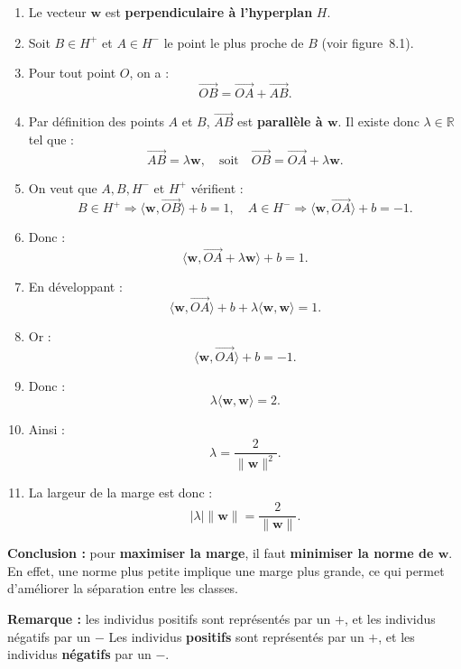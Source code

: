 \begin{enumerate}
    \item Le vecteur \(\mathbf{w}\) est \textbf{perpendiculaire à l’hyperplan} \(H\).
    \item Soit \(B \in H^+\) et \(A \in H^-\) le point le plus proche de \(B\)
    (voir figure~8.1).
    \item Pour tout point \(O\), on a :
    \[
    \overrightarrow{OB} = \overrightarrow{OA} + \overrightarrow{AB}.
    \]
    \item Par définition des points \(A\) et \(B\), \(\overrightarrow{AB}\) est
    \textbf{parallèle à \(\mathbf{w}\)}. Il existe donc \(\lambda \in \mathbb{R}\)
    tel que :
    \[
    \overrightarrow{AB} = \lambda \mathbf{w}, \quad \text{soit} \quad
    \overrightarrow{OB} = \overrightarrow{OA} + \lambda \mathbf{w}.
    \]
    \item On veut que \(A, B, H^-\) et \(H^+\) vérifient :
    \[
    B \in H^+ \Rightarrow \langle \mathbf{w}, \overrightarrow{OB} \rangle + b = 1,
    \quad
    A \in H^- \Rightarrow \langle \mathbf{w}, \overrightarrow{OA} \rangle + b = -1.
    \]
    \item Donc :
    \[
    \langle \mathbf{w}, \overrightarrow{OA} + \lambda \mathbf{w} \rangle + b = 1.
    \]
    \item En développant :
    \[
    \langle \mathbf{w}, \overrightarrow{OA} \rangle + b + \lambda \langle \mathbf{w}, \mathbf{w} \rangle = 1.
    \]
    \item Or :
    \[
    \langle \mathbf{w}, \overrightarrow{OA} \rangle + b = -1.
    \]
    \item Donc :
    \[
    \lambda \langle \mathbf{w}, \mathbf{w} \rangle = 2.
    \]
    \item Ainsi :
    \[
    \lambda = \frac{2}{\|\mathbf{w}\|^2}.
    \]
    \item La largeur de la marge est donc :
    \[
    |\lambda| \|\mathbf{w}\| = \frac{2}{\|\mathbf{w}\|}.
    \]
\end{enumerate}

\textbf{Conclusion :} pour \textbf{maximiser la marge}, il faut \textbf{minimiser
la norme de \(\mathbf{w}\)}. En effet, une norme plus petite implique une marge
plus grande, ce qui permet d’améliorer la séparation entre les classes.  

\textbf{Remarque :} les individus positifs sont représentés par un \(+\), et les
individus négatifs par un \(-\) Les individus \textbf{positifs} sont représentés par un \(+\), et les
individus \textbf{négatifs} par un \(-\).

